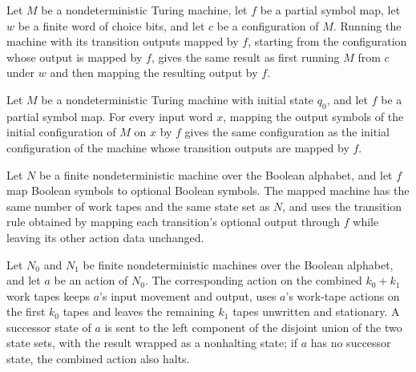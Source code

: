 \begin{theorem}
\label{Turing.NDTM.mapOutput_runWith}
\leanok
{}
Let $M$ be a nondeterministic Turing machine, let $f$ be a partial symbol map, let $w$
be a finite word of choice bits, and let $c$ be a configuration of $M$. Running the
machine with its transition outputs mapped by $f$, starting from the configuration whose
output is mapped by $f$, gives the same result as first running $M$ from $c$ under $w$
and then mapping the resulting output by $f$.
\end{theorem}

\begin{theorem}
\label{Turing.NDTM.mapOutput_initCfg}
\leanok
{}
Let $M$ be a nondeterministic Turing machine with initial state $q_0$, and let $f$ be a
partial symbol map. For every input word $x$, mapping the output symbols of the initial
configuration of $M$ on $x$ by $f$ gives the same configuration as the initial
configuration of the machine whose transition outputs are mapped by $f$.
\end{theorem}

\begin{definition}
\label{Turing.FinNDTM.mapOutput}
\leanok
{}
Let $N$ be a finite nondeterministic machine over the Boolean alphabet, and let $f$ map
Boolean symbols to optional Boolean symbols. The mapped machine has the same number of
work tapes and the same state set as $N$, and uses the transition rule obtained by
mapping each transition's optional output through $f$ while leaving its other action
data unchanged.
\end{definition}

\begin{definition}
\leanok
{}
Let $N_0$ and $N_1$ be finite nondeterministic machines over the Boolean alphabet, and
let $a$ be an action of $N_0$. The corresponding action on the combined $k_0+k_1$ work
tapes keeps $a$'s input movement and output, uses $a$'s work-tape actions on the first
$k_0$ tapes and leaves the remaining $k_1$ tapes unwritten and stationary. A successor
state of $a$ is sent to the left component of the disjoint union of the two state sets,
with the result wrapped as a nonhalting state; if $a$ has no successor state, the
combined action also halts.
\end{definition}

